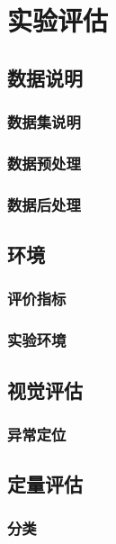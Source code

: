 \chapter{实验评估}

\section{数据说明}
    \subsection{数据集说明} %
    \subsection{数据预处理}
    \subsection{数据后处理}


\section{环境}
    \subsection{评价指标}
    \subsection{实验环境}

\section{视觉评估}
    \subsection{异常定位}
    \subsection{}

\section{定量评估}
    \subsection{分类}
